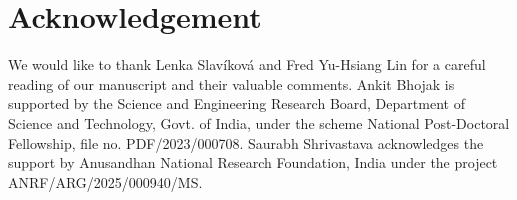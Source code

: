 \documentclass[a4paper,reqno]{amsart}
\theoremstyle{definition}
\numberwithin{equation}{section}
\begin{document}
\section*{Acknowledgement}
We would like to thank Lenka Slav\'ikov\'a and Fred Yu-Hsiang Lin for a careful reading of our manuscript and their valuable comments. Ankit Bhojak is supported by the Science and Engineering Research Board, Department of Science and Technology, Govt. of India, under the scheme National Post-Doctoral Fellowship, file no. PDF/2023/000708. Saurabh Shrivastava acknowledges the support by Anusandhan National Research Foundation, India under the project ANRF/ARG/2025/000940/MS. 

\end{document}
